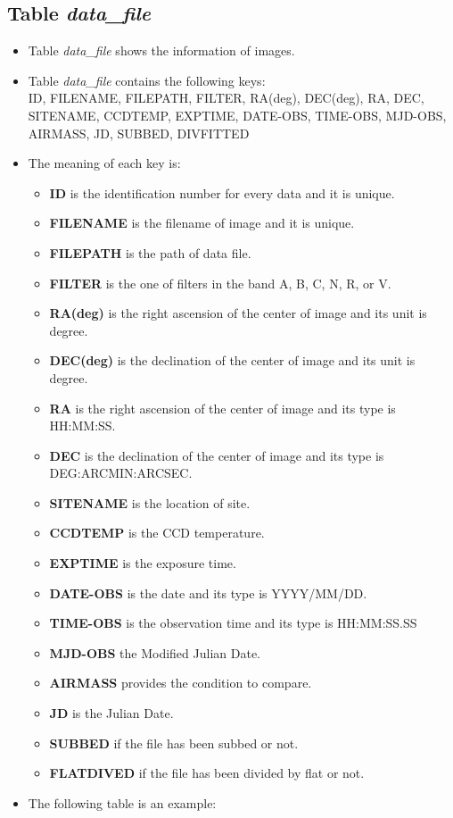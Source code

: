 \documentclass[12pt]{article}    %
\begin{document}
 \subsection{Table {\it data\_file}}
 \begin{itemize}
  \item Table {\it data\_file} shows the information of images.
  \item Table {\it data\_file} contains the following keys:\\
  \footnotesize
  \indent ID, FILENAME, FILEPATH, FILTER, RA(deg), DEC(deg), RA, DEC, SITENAME, CCDTEMP, EXPTIME, DATE-OBS, TIME-OBS, MJD-OBS, AIRMASS, JD, SUBBED, DIVFITTED
  \normalsize
  \item The meaning of each key is:
  \begin{itemize}
   \item {\bf ID} is the identification number for every data and it is unique.
   \item {\bf FILENAME} is the filename of image and it is unique.
   \item {\bf FILEPATH} is the path of data file.
   \item {\bf FILTER} is the one of filters in the band A, B, C, N, R, or V.
   \item {\bf RA(deg)} is the right ascension of the center of image and its unit is degree.
   \item {\bf DEC(deg)} is the declination of the center of image and its unit is degree.
   \item \textbf {RA} is the right ascension of the center of image and its type is HH:MM:SS.
   \item \textbf {DEC} is the declination of the center of image and its type is DEG:ARCMIN:ARCSEC.
   \item {\bf SITENAME} is the location of site.
   \item {\bf CCDTEMP} is the CCD temperature.
   \item {\bf EXPTIME} is the exposure time.
   \item {\bf DATE-OBS} is the date and its type is YYYY/MM/DD.
   \item {\bf TIME-OBS} is the observation time and its type is HH:MM:SS.SS
   \item {\bf MJD-OBS} the Modified Julian Date.
   \item {\bf AIRMASS} provides the condition to compare.
   \item {\bf JD} is the Julian Date.
   \item {\bf SUBBED} if the file has been subbed or not.
   \item {\bf FLATDIVED} if the file has been divided by flat or not.
   
  \end{itemize}
	
  \item The following table is an example:
 \end{itemize}
	
\end{document}
